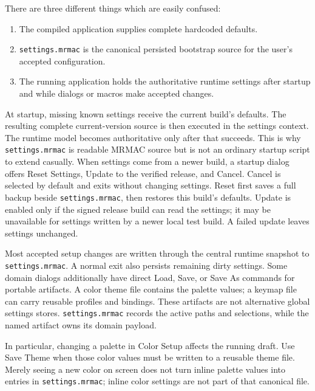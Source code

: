 \documentclass[a4paper,10pt,twoside,openany]{book}
\begin{document}
There are three different things which are easily confused:
\begin{enumerate}
\item The compiled application supplies complete hardcoded defaults.
\item \texttt{settings.mrmac} is the canonical persisted bootstrap source for
the user's accepted configuration.
\item The running application holds the authoritative runtime settings after
startup and while dialogs or macros make accepted changes.
\end{enumerate}
At startup, missing known settings receive the current build's defaults. The
resulting complete current-version source is then executed in the settings
context. The runtime model becomes authoritative only after that succeeds.
This is why \texttt{settings.mrmac} is readable MRMAC source but is not an
ordinary startup script to extend casually.
When settings come from a newer build, a startup dialog offers
\textsf{Reset Settings}, \textsf{Update to} the verified release, and
\textsf{Cancel}. Cancel is selected by default and exits without changing
settings. Reset first saves a full backup beside \texttt{settings.mrmac},
then restores this build's defaults. Update is enabled only if the signed
release build can read the settings; it may be unavailable for settings
written by a newer local test build. A failed update leaves settings unchanged.

Most accepted setup changes are written through the central runtime snapshot
to \texttt{settings.mrmac}. A normal exit also persists remaining dirty
settings. Some domain dialogs additionally have direct \textsf{Load},
\textsf{Save}, or \textsf{Save As} commands for portable artifacts. A color
theme file contains the palette values; a keymap file can carry reusable
profiles and bindings. These artifacts are not alternative global settings
stores. \texttt{settings.mrmac} records the active paths and selections, while
the named artifact owns its domain payload.

In particular, changing a palette in Color Setup affects the running draft.
Use \textsf{Save Theme} when those color values must be written to a reusable
theme file. Merely seeing a new color on screen does not turn inline palette
values into entries in \texttt{settings.mrmac}; inline color settings are not
part of that canonical file.
\end{document}
